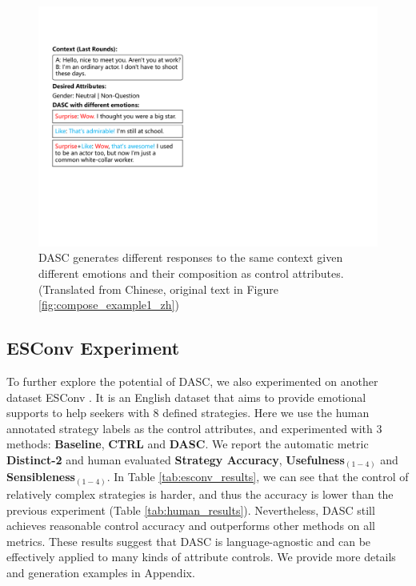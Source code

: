 \begin{figure}[t]
    \centering
    \includegraphics[width=1.0\columnwidth]{figures/compose_example1_en.pdf}
    \caption{DASC generates different responses to the same context given different emotions and their composition as control attributes. (Translated from Chinese, original text in Figure \ref{fig:compose_example1_zh})}
    \label{fig:compose_example1_en}
\end{figure}

\subsection{ESConv Experiment}

To further explore the potential of DASC, we also experimented on another dataset ESConv \citep{liu2021towards}. It is an English dataset that aims to provide emotional supports to help seekers with 8 defined strategies. Here we use the human annotated strategy labels as the control attributes, and experimented with 3 methods: \textbf{Baseline}, \textbf{CTRL} and \textbf{DASC}. We report the automatic metric \textbf{Distinct-2} and human evaluated \textbf{Strategy Accuracy}, \textbf{Usefulness}$_{(1-4)}$ and \textbf{Sensibleness}$_{(1-4)}$. In Table \ref{tab:esconv_results}, we can see that the control of relatively complex strategies is harder, and thus the accuracy is lower than the previous experiment (Table \ref{tab:human_results}). Nevertheless, DASC still achieves reasonable control accuracy and outperforms other methods on all metrics. These results suggest that DASC is language-agnostic and can be effectively applied to many kinds of attribute controls. We provide more details and generation examples in Appendix.

